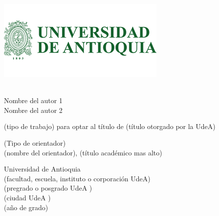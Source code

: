  \begin{center}

    \includegraphics[scale=0.72]{imagenes/escudo_udea.png}

    \vspace{2cm}
    \textbf{\mititulo} \\[2cm]%
    
    Nombre del autor 1\\
    Nombre del autor 2
    
    \vspace{2cm}
    (tipo de trabajo) para optar al título de  (título otorgado por la UdeA)%
    
    \vspace{2cm}
    (Tipo de orientador)\\
    (nombre del orientador), (título académico mas alto)%
    
    \vspace{1cm}
    Universidad de Antioquia\\
    (facultad, escuela, instituto o corporación UdeA)\\
    (pregrado o posgrado UdeA )\\
    (ciudad UdeA )\\
    (año de grado) %
    
    
    
    
    \newpage
    

\end{center}
